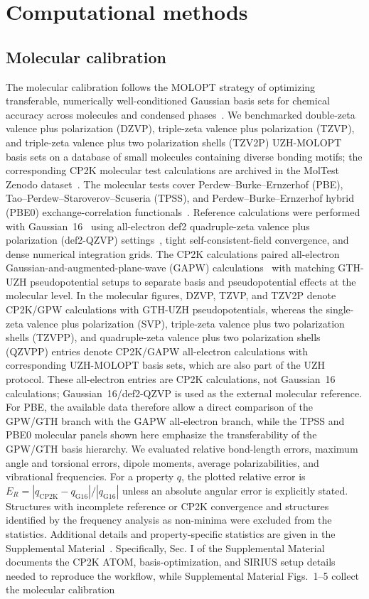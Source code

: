 \documentclass[aps,prb,reprint,amsmath,amssymb,superscriptaddress,longbibliography,floatfix]{revtex4-2}
\begin{document}
\section{Computational methods}
\subsection{Molecular calibration}
The molecular calibration follows the MOLOPT strategy of optimizing transferable, numerically well-conditioned Gaussian basis sets for chemical accuracy across molecules and condensed phases~\cite{VandeVondele2007}. We benchmarked double-zeta valence plus polarization (DZVP), triple-zeta valence plus polarization (TZVP), and triple-zeta valence plus two polarization shells (TZV2P) UZH-MOLOPT basis sets on a database of small molecules containing diverse bonding motifs; the corresponding CP2K molecular test calculations are archived in the MolTest Zenodo dataset~\cite{HutterMuller2023MolTest}. The molecular tests cover Perdew--Burke--Ernzerhof (PBE), Tao--Perdew--Staroverov--Scuseria (TPSS), and Perdew--Burke--Ernzerhof hybrid (PBE0) exchange-correlation functionals~\cite{Perdew1996,Tao2003TPSS,Adamo1999}. Reference calculations were performed with Gaussian~16~\cite{Gaussian16} using all-electron def2 quadruple-zeta valence plus polarization (def2-QZVP) settings~\cite{Weigend2005}, tight self-consistent-field convergence, and dense numerical integration grids. The CP2K calculations paired all-electron Gaussian-and-augmented-plane-wave (GAPW) calculations~\cite{Lippert1999GAPW} with matching GTH-UZH pseudopotential setups to separate basis and pseudopotential effects at the molecular level. In the molecular figures, DZVP, TZVP, and TZV2P denote CP2K/GPW calculations with GTH-UZH pseudopotentials, whereas the single-zeta valence plus polarization (SVP), triple-zeta valence plus two polarization shells (TZVPP), and quadruple-zeta valence plus two polarization shells (QZVPP) entries denote CP2K/GAPW all-electron calculations with corresponding UZH-MOLOPT basis sets, which are also part of the UZH protocol. These all-electron entries are CP2K calculations, not Gaussian~16 calculations; Gaussian~16/def2-QZVP is used as the external molecular reference. For PBE, the available data therefore allow a direct comparison of the GPW/GTH branch with the GAPW all-electron branch, while the TPSS and PBE0 molecular panels shown here emphasize the transferability of the GPW/GTH basis hierarchy. We evaluated relative bond-length errors, maximum angle and torsional errors, dipole moments, average polarizabilities, and vibrational frequencies. For a property $q$, the plotted relative error is $E_R=|q_{\mathrm{CP2K}}-q_{\mathrm{G16}}|/|q_{\mathrm{G16}}|$ unless an absolute angular error is explicitly stated. Structures with incomplete reference or CP2K convergence and structures identified by the frequency analysis as non-minima were excluded from the statistics. Additional details and property-specific statistics are given in the Supplemental Material~\cite{SuppMat}. Specifically, Sec. I of the Supplemental Material documents the CP2K ATOM, basis-optimization, and SIRIUS setup details needed to reproduce the workflow, while Supplemental Material Figs.~1--5 collect the molecular calibration 
\end{document}
